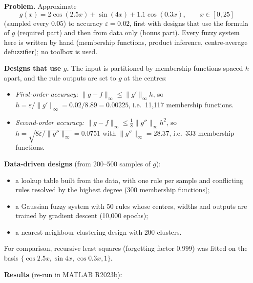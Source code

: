 


\textbf{Problem.} Approximate
\[ g(x)=2\cos(2.5x)+\sin(4x)+1.1\cos(0.3x),\qquad x\in[0,25] \]
(sampled every $0.05$) to accuracy $\varepsilon=0.02$, first with designs that use the formula of $g$ (required part) and then from data only (bonus part). Every fuzzy system here is written by hand (membership functions, product inference, centre-average defuzzifier); no toolbox is used.

\textbf{Designs that use $g$.} The input is partitioned by membership functions spaced $h$ apart, and the rule outputs are set to $g$ at the centres:
\begin{itemize}
  \item \emph{First-order accuracy:} $\|g-f\|_\infty\le\|g'\|_\infty h$, so $h=\varepsilon/\|g'\|_\infty=0.02/8.89=0.00225$, i.e.\ 11{,}117 membership functions.
  \item \emph{Second-order accuracy:} $\|g-f\|_\infty\le\tfrac18\|g''\|_\infty h^2$, so $h=\sqrt{8\varepsilon/\|g''\|_\infty}=0.0751$ with $\|g''\|_\infty=28.37$, i.e.\ 333 membership functions.
\end{itemize}

\textbf{Data-driven designs} (from 200--500 samples of $g$):
\begin{itemize}
  \item a lookup table built from the data, with one rule per sample and conflicting rules resolved by the highest degree (300 membership functions);
  \item a Gaussian fuzzy system with 50 rules whose centres, widths and outputs are trained by gradient descent (10{,}000 epochs);
  \item a nearest-neighbour clustering design with 200 clusters.
\end{itemize}
For comparison, recursive least squares (forgetting factor $0.999$) was fitted on the basis $\{\cos2.5x,\sin4x,\cos0.3x,1\}$.

\textbf{Results} (re-run in MATLAB R2023b):

